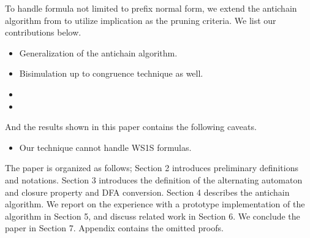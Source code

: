   To handle formula not limited to prefix normal
form, we extend the antichain algorithm from \cite{Wulf2006} to utilize
implication as the pruning criteria. We list our contributions below.

\begin{itemize}
\item Generalization of the antichain algorithm.
\item Bisimulation up to congruence technique \cite{BonchiP13} as well.
\item {}
\item {}
\end{itemize}

And the results shown in this paper contains the following caveats.
\begin{itemize}
\item Our technique cannot handle WS1S formulas.
\end{itemize}

The paper is organized as follows; Section 2 introduces preliminary definitions
and notations. Section 3 introduces the definition of the alternating automaton
and closure property and DFA conversion. Section 4 describes the antichain
algorithm. We report on the experience with a prototype implementation of the
algorithm in Section 5, and discuss related work in Section 6. We conclude the
paper in Section 7. Appendix contains the omitted proofs.
